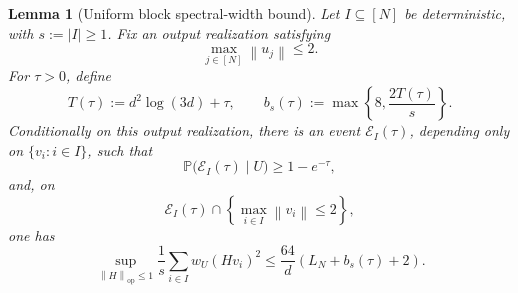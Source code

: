 \documentclass[11pt]{article}
\newtheorem{lemma}[theorem]{Lemma}
\newcommand{\Pp}{\mathbb{P}}
\newcommand{\1}{\mathbf{1}}
\newcommand{\op}{\mathrm{op}}
\newcommand{\norm}[1]{\left\|#1\right\|}
\newcommand{\abs}[1]{\left|#1\right|}
\begin{document}
\begin{lemma}[Uniform block spectral-width bound]
\label{lem:block-width}
Let \(I\subseteq[N]\) be deterministic, with \(s:=\abs{I}\ge1\).  Fix an
output realization satisfying
\[
 \max_{j\in[N]}\norm{u_j}\le2.
\]
For \(\tau>0\), define
\[
 T(\tau):=d^2\log(3d)+\tau,
 \qquad
 b_s(\tau):=\max\left\{8,\frac{2T(\tau)}s\right\}.
\]
Conditionally on this output realization, there is an event
\(\mathcal E_I(\tau)\), depending only on \(\{v_i:i\in I\}\), such that
\[
 \Pp\bigl(\mathcal E_I(\tau)\mid U\bigr)\ge1-e^{-\tau},
\]
and, on
\[
 \mathcal E_I(\tau)
 \cap
 \left\{\max_{i\in I}\norm{v_i}\le2\right\},
\]
one has
\[
 \boxed{
 \sup_{\norm{H}_{\op}\le1}
 \frac1s\sum_{i\in I}w_U(Hv_i)^2
 \le
 \frac{64}{d}\left(L_N+b_s(\tau)+2\right).
 }
\]
\end{lemma}
\end{document}
